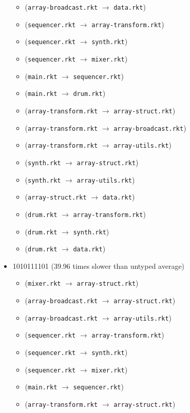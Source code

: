 \documentclass{article}
\newcommand{\mono}[1]{\texttt{#1}}
\begin{document}
\begin{itemize}
\begin{itemize}
  \item (\mono{array-broadcast.rkt} $\rightarrow$ \mono{data.rkt})
  \item (\mono{sequencer.rkt} $\rightarrow$ \mono{array-transform.rkt})
  \item (\mono{sequencer.rkt} $\rightarrow$ \mono{synth.rkt})
  \item (\mono{sequencer.rkt} $\rightarrow$ \mono{mixer.rkt})
  \item (\mono{main.rkt} $\rightarrow$ \mono{sequencer.rkt})
  \item (\mono{main.rkt} $\rightarrow$ \mono{drum.rkt})
  \item (\mono{array-transform.rkt} $\rightarrow$ \mono{array-struct.rkt})
  \item (\mono{array-transform.rkt} $\rightarrow$ \mono{array-broadcast.rkt})
  \item (\mono{array-transform.rkt} $\rightarrow$ \mono{array-utils.rkt})
  \item (\mono{synth.rkt} $\rightarrow$ \mono{array-struct.rkt})
  \item (\mono{synth.rkt} $\rightarrow$ \mono{array-utils.rkt})
  \item (\mono{array-struct.rkt} $\rightarrow$ \mono{data.rkt})
  \item (\mono{drum.rkt} $\rightarrow$ \mono{array-transform.rkt})
  \item (\mono{drum.rkt} $\rightarrow$ \mono{synth.rkt})
  \item (\mono{drum.rkt} $\rightarrow$ \mono{data.rkt})
  \end{itemize}
\item 1010111101 (39.96 times slower than untyped average)
  \begin{itemize}
  \item (\mono{mixer.rkt} $\rightarrow$ \mono{array-struct.rkt})
  \item (\mono{array-broadcast.rkt} $\rightarrow$ \mono{array-struct.rkt})
  \item (\mono{array-broadcast.rkt} $\rightarrow$ \mono{array-utils.rkt})
  \item (\mono{sequencer.rkt} $\rightarrow$ \mono{array-transform.rkt})
  \item (\mono{sequencer.rkt} $\rightarrow$ \mono{synth.rkt})
  \item (\mono{sequencer.rkt} $\rightarrow$ \mono{mixer.rkt})
  \item (\mono{main.rkt} $\rightarrow$ \mono{sequencer.rkt})
  \item (\mono{array-transform.rkt} $\rightarrow$ \mono{array-struct.rkt})

\end{itemize}
\end{itemize}
\end{document}

